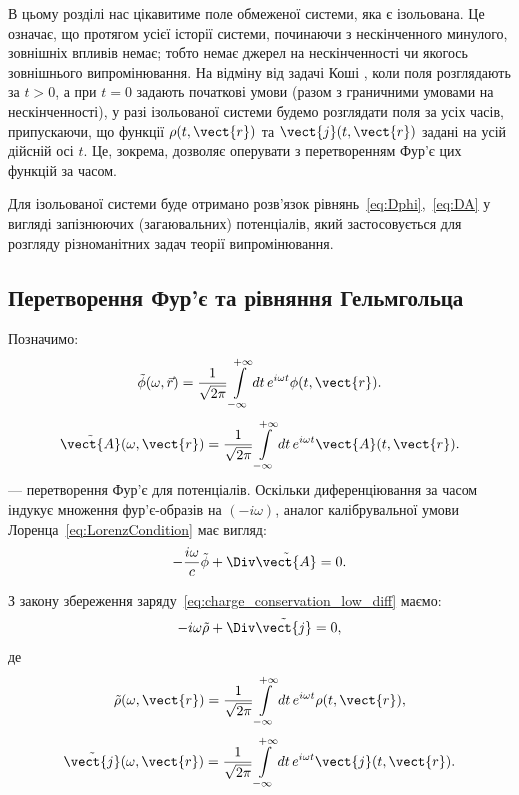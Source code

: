 В цьому розділі нас цікавитиме поле обмеженої системи, яка є ізольована. Це означає, що протягом усієї історії системи, починаючи з нескінченного
минулого, зовнішніх впливів немає; тобто немає джерел на нескінченності чи якогось зовнішнього випромінювання. На відміну від задачі Коші , коли поля
розглядають за $t >0$, а при $t =0$ задають початкові умови (разом з граничними умовами на нескінченності), у разі ізольованої системи будемо розглядати
поля за усіх часів, припускаючи, що функції $\rho(t, \vect{r})$ та $\vect{j}(t, \vect{r})$ задані на усій дійсній осі $t$. Це, зокрема, дозволяє
оперувати з перетворенням Фур’є цих функцій за часом.

Для ізольованої системи буде отримано розв’язок рівнянь~\eqref{eq:Dphi},~\eqref{eq:DA} у вигляді
запізнюючих (загаювальних) потенціалів, який застосовується для розгляду різноманітних задач теорії випромінювання.


\subsection*{Перетворення Фур’є та рівняння Гельмгольца}

Позначимо:
\begin{equation}\label{eq:tilde_phi}
	\tilde{\phi}(\omega, \vec{r}) = \frac{1}{\sqrt{2\pi}} \int\limits_{-\infty}^{+\infty} dt \, e^{i \omega t} \phi(t, \vect{r}).
\end{equation}
\begin{equation}\label{eq:tilde_A}
	\tilde{\vect{A}}(\omega, \vect{r}) = \frac{1}{\sqrt{2\pi}} \int\limits_{-\infty}^{+\infty} dt \, e^{i \omega t} \vect{A}(t, \vect{r}).
\end{equation}
--- перетворення Фур’є для потенціалів.
Оскільки диференціювання за часом індукує множення фур’є-образів на \((-i \omega)\), аналог калібрувальної умови Лоренца~\eqref{eq:LorenzCondition} має
вигляд:
\begin{equation}
	-\frac{i \omega}{c} \tilde{\phi} + \Div \tilde{\vect{A}} = 0.
\end{equation}

З закону збереження заряду~\eqref{eq:charge_conservation_low_diff} маємо:
\begin{equation}
	-i \omega \tilde{\rho} + \Div \tilde{\vect{j}} = 0,
\end{equation}
де
\begin{equation}
	\tilde{\rho}(\omega, \vect{r}) = \frac{1}{\sqrt{2\pi}} \int\limits_{-\infty}^{+\infty} dt \, e^{i \omega t} \rho(t, \vect{r}),
\end{equation}
\begin{equation}
	\tilde{\vect{j}}(\omega, \vect{r}) = \frac{1}{\sqrt{2\pi}} \int\limits_{-\infty}^{+\infty} dt \, e^{i \omega t} \vect{j}(t, \vect{r}).
\end{equation}


